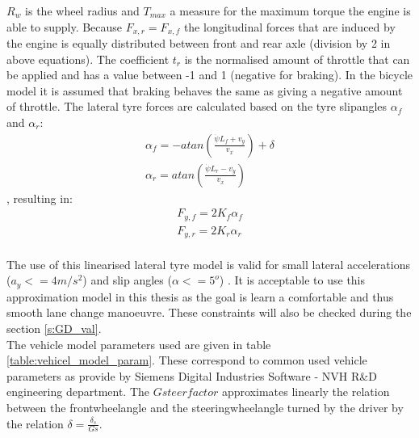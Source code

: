 $R_w$ is the wheel radius and $T_{max}$ a measure for the maximum torque the engine is able to supply. Because $F_{x,r} = F_{x, f}$ the longitudinal forces that are induced by the engine is equally distributed between front and rear axle (division by 2 in above equations). The coefficient $t_r$ is the normalised amount of throttle that can be applied and has a value between -1 and 1 (negative for braking). In the bicycle model it is assumed that braking behaves the same as giving a negative amount of throttle.
The lateral tyre forces are calculated based on the tyre slipangles $\alpha_f$ and $\alpha_r$:
\begin{equation}\label{eq:bicycle_slipangle}
\begin{aligned}
\alpha_f = -atan(\frac{\dot{\psi} L_f + v_y}{v_x}) + \delta\\
\alpha_r = atan(\frac{\dot{\psi} L_r - v_y}{v_x})
\end{aligned}
\end{equation},
resulting in:
\begin{equation}\label{eq:bicycle_Fy}
\begin{aligned}
F_{y,f} = 2 K_f \alpha_f\\
F_{y,r} = 2 K_r \alpha_r
\end{aligned}
\end{equation}\\
The use of this linearised lateral tyre model is valid for small lateral accelerations ($a_y <= 4 m/s^2$) and slip angles ($\alpha <= 5^o$) \cite{TongDuySon2019}. It is acceptable to use this approximation model in this thesis as the goal is learn a comfortable and thus smooth lane change manoeuvre. These constraints will also be checked during the section \ref{s:GD_val}.\\

The vehicle model parameters used are given in table \ref{table:vehicel_model_param}. These correspond to common used vehicle parameters as provide by Siemens Digital Industries Software - NVH R\&D engineering department. The $Gsteerfactor$ approximates linearly the relation between the frontwheelangle and the steeringwheelangle turned by the driver by the relation $\delta = \frac{\delta_s}{Gs}$.  

